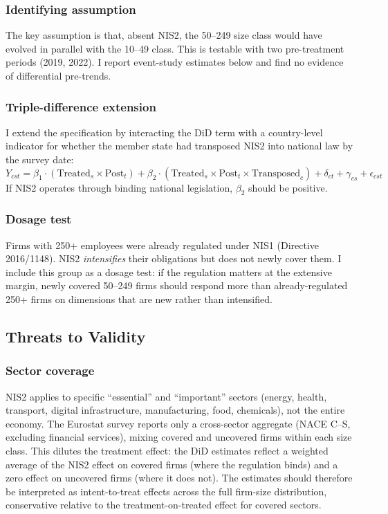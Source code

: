 \documentclass[12pt]{article}
\begin{document}
\subsubsection*{Identifying assumption} The key assumption is that, absent NIS2, the 50--249 size class would have evolved in parallel with the 10--49 class. This is testable with two pre-treatment periods (2019, 2022). I report event-study estimates below and find no evidence of differential pre-trends.

\subsubsection*{Triple-difference extension} I extend the specification by interacting the DiD term with a country-level indicator for whether the member state had transposed NIS2 into national law by the survey date:
\begin{equation}
Y_{cst} = \beta_1 \cdot (\text{Treated}_s \times \text{Post}_t) + \beta_2 \cdot (\text{Treated}_s \times \text{Post}_t \times \text{Transposed}_c) + \delta_{ct} + \gamma_{cs} + \epsilon_{cst}
\end{equation}
If NIS2 operates through binding national legislation, $\beta_2$ should be positive.

\subsubsection*{Dosage test} Firms with 250+ employees were already regulated under NIS1 (Directive 2016/1148). NIS2 \textit{intensifies} their obligations but does not newly cover them. I include this group as a dosage test: if the regulation matters at the extensive margin, newly covered 50--249 firms should respond more than already-regulated 250+ firms on dimensions that are new rather than intensified.

\subsection{Threats to Validity}

\subsubsection*{Sector coverage} NIS2 applies to specific ``essential'' and ``important'' sectors (energy, health, transport, digital infrastructure, manufacturing, food, chemicals), not the entire economy. The Eurostat survey reports only a cross-sector aggregate (NACE C--S, excluding financial services), mixing covered and uncovered firms within each size class. This dilutes the treatment effect: the DiD estimates reflect a weighted average of the NIS2 effect on covered firms (where the regulation binds) and a zero effect on uncovered firms (where it does not). The estimates should therefore be interpreted as intent-to-treat effects across the full firm-size distribution, conservative relative to the treatment-on-treated effect for covered sectors.
\end{document}
